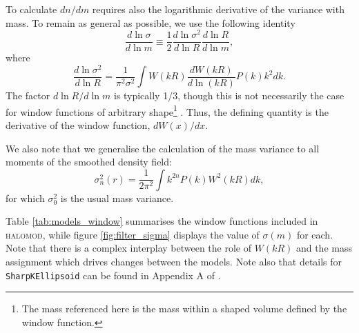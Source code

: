 \documentclass[5p,aas_macros]{elsarticle}
\begin{document}
To calculate $dn/dm$ requires also the logarithmic derivative of the variance with mass. To remain as general as possible, we use the following identity
\begin{equation}
    \label{eq:dlnssdlnm}
     \frac{d \ln \sigma}{d \ln m} \equiv \frac{1}{2}\frac{d \ln \sigma^2}{d \ln R} \frac{d \ln R}{d \ln m},
\end{equation}
where 
\begin{equation}
    \label{eq:dlnssdlnr}
    \frac{d\ln \sigma^2}{d\ln R} = \frac{1}{\pi^2 \sigma^2}\int W(kR) \frac{dW(kR)}{d\ln (kR)} P(k) k^2 dk.
\end{equation}
The factor $d\ln R/d\ln m$ is typically 1/3, though this is not necessarily the case for window functions of arbitrary shape\footnote{The mass referenced here is the mass within a shaped volume defined by the window function.} \citep{Schneider2013}. Thus, the defining quantity is the derivative of the window function, $dW(x)/dx$. 

We also note that we generalise the calculation of the mass variance to all moments of the smoothed density field:
\begin{equation}
    \label{eq:moments}
    \sigma_n^2(r) = \frac{1}{2\pi^2}\int k^{2n} P(k) W^2(kR) dk,
\end{equation}
for which $\sigma_0^2$ is the usual mass variance.

Table \ref{tab:models_window} summarises the window functions included in \textsc{halomod}, while figure \ref{fig:filter_sigma} displays the value of $\sigma(m)$ for each. Note that there is a complex interplay between the role of $W(kR)$ and the mass assignment which drives changes between the models. Note also that details for \texttt{SharpKEllipsoid} can be found in Appendix A of \cite{Schneider2013}.
\end{document}
